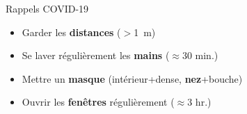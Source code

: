 \documentclass[french,c,
hyperref={%
    pdftitle={Rappels COVID-19},%
    pdfauthor={Guillaume MULLER},%
    pdfsubject={COVID-19},%
    pdfkeywords={COVID-19}%
    colorlinks=true,%
    urlcolor=blue,%
    linkcolor=%
  },%
xcolor={pdftex,svgnames}, %
]{beamer}  %
\begin{document}
\begin{frame}{Rappels COVID-19}
  \begin{itemize}
    \item[]  \hspace{.8cm}
      Garder les \textbf{distances} { \scriptsize ($>$1~m) }
    \item[]  \hspace{.8cm}
      Se laver régulièrement les \textbf{mains} { \scriptsize ($\approx$30 min.) }
    \item[]  \hspace{.8cm}
      Mettre un \textbf{masque} { \scriptsize (intérieur+dense, \textbf{nez}+bouche) }
    \item[]  \hspace{.8cm}
      Ouvrir les \textbf{fenêtres} régulièrement { \scriptsize ($\approx$3 hr.)}
  \end{itemize}
\end{frame}
\end{document}
